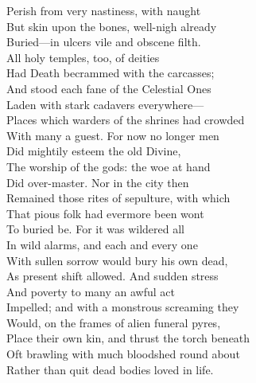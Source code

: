 Perish from very nastiness, with naught\\
But skin upon the bones, well-nigh already\\
Buried—in ulcers vile and obscene filth.\\
All holy temples, too, of deities\\
Had Death becrammed with the carcasses;\\
And stood each fane of the Celestial Ones\\
Laden with stark cadavers everywhere—\\
Places which warders of the shrines had crowded\\
With many a guest. For now no longer men\\
Did mightily esteem the old Divine,\\
The worship of the gods: the woe at hand\\
Did over-master. Nor in the city then\\
Remained those rites of sepulture, with which\\
That pious folk had evermore been wont\\
To buried be. For it was wildered all\\
In wild alarms, and each and every one\\
With sullen sorrow would bury his own dead,\\
As present shift allowed. And sudden stress\\
And poverty to many an awful act\\
Impelled; and with a monstrous screaming they\\
Would, on the frames of alien funeral pyres,\\
Place their own kin, and thrust the torch beneath\\
Oft brawling with much bloodshed round about\\
Rather than quit dead bodies loved in life.
